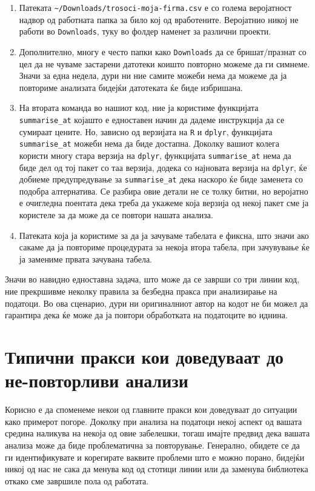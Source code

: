 \documentclass[
]{book}
\begin{document}
\begin{enumerate}
\def\labelenumi{\arabic{enumi}.}
\setcounter{enumi}{3}
\item
  Патеката \texttt{\textasciitilde{}/Downloads/trosoci-moja-firma.csv} е со голема веројатност надвор од работната папка за било кој од вработените. Веројатнио никој не работи во \texttt{Downloads}, туку во фолдер наменет за различни проекти.
\item
  Дополнително, многу е често папки како \texttt{Downloads} да се бришат/празнат со цел да не чуваме застарени датотеки коишто повторно можеме да ги симнеме. Значи за една недела, дури ни ние самите можеби нема да можеме да ја повториме анализата бидејќи датотеката ќе биде избришана.
\item
  На втората команда во нашиот код, ние ја користиме функцијата \texttt{summarise\_at} којашто е едноставен начин да дадеме инструкција да се сумираат цените. Но, зависно од верзијата на \texttt{R} и \texttt{dplyr}, функцијата \texttt{summarise\_at} можеби нема да биде достапна. Доколку вашиот колега користи многу стара верзија на \texttt{dplyr}, функцијата \texttt{summarise\_at} нема да биде дел од тој пакет со таа верзија, додека со најновата верзија на \texttt{dplyr}, ќе добиеме предупредување за \texttt{summarise\_at} дека наскоро ќе биде заменета со подобра алтернатива. Се разбира овие детали не се толку битни, но веројатно е очигледна поентата дека треба да укажеме која верзија од некој пакет сме ја користеле за да може да се повтори нашата анализа.
\item
  Патеката која ја користиме за да ја зачуваме табелата е фиксна, што значи ако сакаме да ја повториме процедурата за некоја втора табела, при зачувување ќе ја замениме првата зачувана табела.
\end{enumerate}

Значи во навидно едноставна задача, што може да се заврши со три линии код, ние прекршивме неколку правила за безбедна пракса при анализирање на податоци. Во ова сценарио, дури ни оригиналниот автор на кодот не би можел да гарантира дека ќе може да ја повтори обработката на податоците во иднина.

\hypertarget{indicators}{%
\section{Типични пракси кои доведуваат до не-повторливи анализи}\label{indicators}}

Корисно е да споменеме некои од главните пракси кои доведуваат до ситуации како примерот погоре. Доколку при анализа на податоци некој аспект од вашата средина наликува на некоја од овие забелешки, тогаш имајте предвид дека вашата анализа може да биде проблематична за повторување. Генерално, обидете се да ги идентификувате и корегирате ваквите проблеми што е можно порано, бидејќи никој од нас не сака да менува код од стотици линии или да заменува библиотека откако сме завршиле пола од работата.
\end{document}
